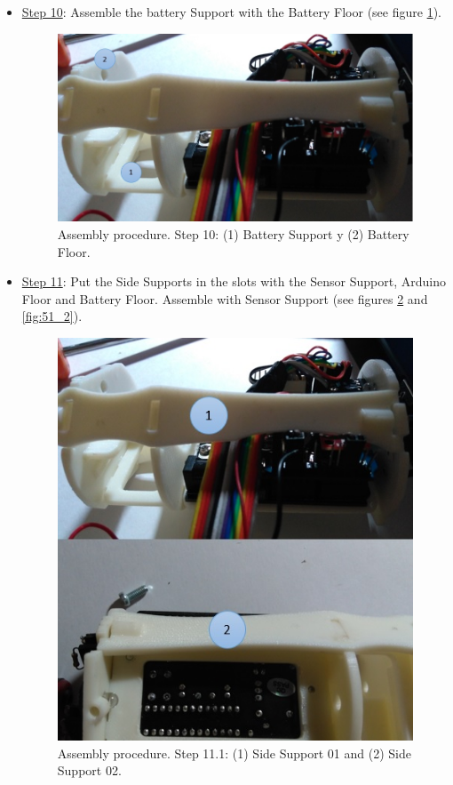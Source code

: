 \documentclass[12pt,letterpaper]{article}
\numberwithin{figure}{section}
\numberwithin{equation}{section}
\numberwithin{table}{section}
\begin{document}
\begin{itemize}
    \item \underline{Step 10}: Assemble the battery Support with the Battery Floor (see figure \ref{fig:50}). 
    
    \begin{figure}[H]
        \centering
        \includegraphics[scale=0.5]{Figuras/figure_50.jpg}
        \caption{Assembly procedure. Step 10: (1) Battery Support y (2) Battery Floor.}
        \label{fig:50}    
    \end{figure}
    
\item \underline{Step 11}: Put the Side Supports in the slots with the Sensor Support, Arduino Floor and Battery Floor. Assemble with Sensor Support (see figures \ref{fig:51} and \ref{fig:51_2}).

    \begin{figure}[H]
        \centering
        \includegraphics[scale=0.5]{Figuras/figure_51.jpg}
        \caption{Assembly procedure. Step 11.1: (1) Side Support 01 and (2) Side Support 02.}
        \label{fig:51}    
    \end{figure}
    

\end{itemize}
\end{document}
